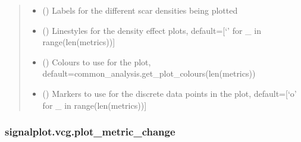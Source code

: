 \documentclass[letterpaper,10pt,english]{sphinxmanual}
\begin{document}
\begin{fulllineitems}
\begin{quote}
\begin{description}
\begin{itemize}
\item {} 
\sphinxAtStartPar
{} (\sphinxstyleliteralemphasis{\sphinxupquote{, }}) \textendash{} Labels for the different scar densities being plotted

\item {} 
\sphinxAtStartPar
{} (\sphinxstyleliteralemphasis{\sphinxupquote{, }}) \textendash{} Linestyles for the density effect plots, default={[}‘\sphinxhyphen{}’ for \_ in range(len(metrics)){]}

\item {} 
\sphinxAtStartPar
{} (\sphinxstyleliteralemphasis{\sphinxupquote{, }}) \textendash{} Colours to use for the plot, default=common\_analysis.get\_plot\_colours(len(metrics))

\item {} 
\sphinxAtStartPar
{} (\sphinxstyleliteralemphasis{\sphinxupquote{, }}) \textendash{} Markers to use for the discrete data points in the plot, default={[}‘o’ for \_ in range(len(metrics)){]}

\end{itemize}

\end{description}\end{quote}

\end{fulllineitems}



\subsubsection{signalplot.vcg.plot\_metric\_change}
\label{\detokenize{_autosummary/signalplot.vcg.plot_metric_change:signalplot-vcg-plot-metric-change}}\label{\detokenize{_autosummary/signalplot.vcg.plot_metric_change::doc}}
\end{document}
